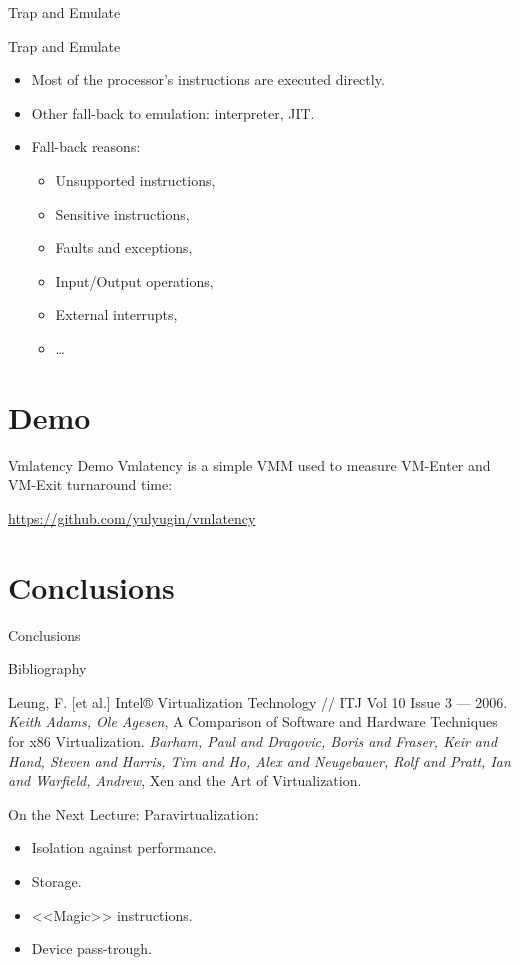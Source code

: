 \begin{frame}{Trap and Emulate}
\centering
{}
\end{frame}

\begin{frame}{Trap and Emulate}
\begin{itemize}
\item Most of the processor's instructions are executed directly.
\item Other fall-back to emulation: interpreter, JIT.\pause
\item Fall-back reasons:
  \begin{itemize}
  \item Unsupported instructions,
  \item Sensitive instructions,
  \item Faults and exceptions,
  \item Input/Output operations,
  \item External interrupts,
  \item \dots
  \end{itemize}
\end{itemize}
\end{frame}

\section{Demo}

\begin{frame}{Vmlatency Demo}
Vmlatency is a simple VMM used to measure VM-Enter and VM-Exit turnaround time:

\url{https://github.com/yulyugin/vmlatency}
\end{frame}

\section*{Conclusions}

\begin{frame}{Conclusions}
\tableofcontents
\end{frame}

\begin{frame}[allowframebreaks]{Bibliography}
  \nocite{popek-goldberg-vm-requirements}
  \printbibliography
\begin{thebibliography}{99}
 Leung, F. [et al.] Intel® Virtualization Technology // ITJ Vol
  10 Issue 3 — 2006.
\bibitem{} \textit{Keith Adams, Ole Agesen}, A Comparison of Software and
  Hardware Techniques for x86 Virtualization.
\bibitem{} \textit{Barham, Paul and Dragovic, Boris and Fraser, Keir and Hand,
  Steven and Harris, Tim and Ho, Alex and Neugebauer, Rolf and Pratt, Ian and
  Warfield, Andrew}, Xen and the Art of Virtualization.
\end{thebibliography}
\end{frame}

\begin{frame}{On the Next Lecture:}
  Paravirtualization:
  \begin{itemize}
    \item Isolation against performance.
    \item Storage.
    \item{<<Magic>> instructions}.
    \item Device pass-trough.
  \end{itemize}
\end{frame}

\finalslide


